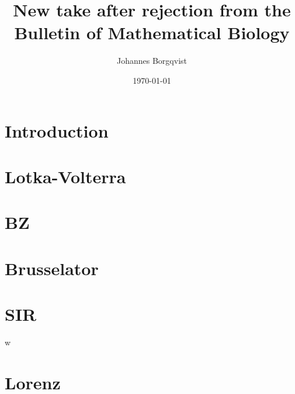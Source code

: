 \documentclass[12pt]{article}
\begin{document}
\title{\textbf{New take after rejection from the Bulletin of Mathematical Biology}}
\author{Johannes Borgqvist}
\date{\today}
\maketitle
\tableofcontents
\clearpage
\section{Introduction}

\section{Lotka-Volterra}

\section{BZ}

\section{Brusselator}

\section{SIR}

w%
\section{Lorenz}

%
\end{document}
